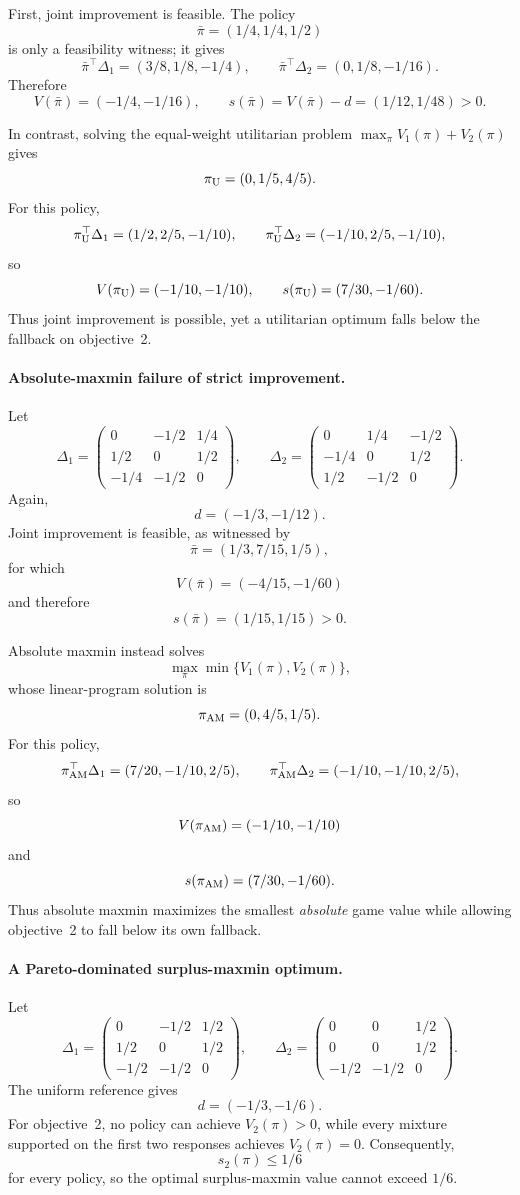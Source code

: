 \documentclass{article}
\theoremstyle{remark}
\theoremstyle{plain}
\begin{document}
First, joint improvement is feasible. The policy
\[
\bar\pi=(1/4,1/4,1/2)
\]
is only a feasibility witness; it gives
\[
\bar\pi^\top \Delta_1=(3/8,1/8,-1/4),
\qquad
\bar\pi^\top \Delta_2=(0,1/8,-1/16).
\]
Therefore
\[
V(\bar\pi)=(-1/4,-1/16),
\qquad
s(\bar\pi)
=
V(\bar\pi)-d
=
(1/12,1/48)>0.
\]

In contrast, solving the equal-weight utilitarian problem
$\max_\pi V_1(\pi)+V_2(\pi)$ gives
\[
\pi_{\rm U}=(0,1/5,4/5).
\]
For this policy,
\[
\pi_{\rm U}^\top \Delta_1=(1/2,2/5,-1/10),
\qquad
\pi_{\rm U}^\top \Delta_2=(-1/10,2/5,-1/10),
\]
so
\[
V(\pi_{\rm U})=(-1/10,-1/10),
\qquad
s(\pi_{\rm U})
=
(7/30,-1/60).
\]
Thus joint improvement is possible, yet a utilitarian optimum falls
below the fallback on objective~2.

\paragraph{Absolute-maxmin failure of strict improvement.}
Let
\[
\Delta_1=
\begin{pmatrix}
0&-1/2&1/4\\
1/2&0&1/2\\
-1/4&-1/2&0
\end{pmatrix},
\qquad
\Delta_2=
\begin{pmatrix}
0&1/4&-1/2\\
-1/4&0&1/2\\
1/2&-1/2&0
\end{pmatrix}.
\]
Again,
\[
d=(-1/3,-1/12).
\]
Joint improvement is feasible, as witnessed by
\[
\bar\pi=(1/3,7/15,1/5),
\]
for which
\[
V(\bar\pi)=(-4/15,-1/60)
\]
and therefore
\[
s(\bar\pi)=(1/15,1/15)>0.
\]

Absolute maxmin instead solves
\[
\max_{\pi}\min\{V_1(\pi),V_2(\pi)\},
\]
whose linear-program solution is
\[
\pi_{\rm AM}=(0,4/5,1/5).
\]
For this policy,
\[
\pi_{\rm AM}^\top \Delta_1=(7/20,-1/10,2/5),
\qquad
\pi_{\rm AM}^\top \Delta_2=(-1/10,-1/10,2/5),
\]
so
\[
V(\pi_{\rm AM})=(-1/10,-1/10)
\]
and
\[
s(\pi_{\rm AM})
=
(7/30,-1/60).
\]
Thus absolute maxmin maximizes the smallest \emph{absolute} game value
while allowing objective~2 to fall below its own fallback.

\paragraph{A Pareto-dominated surplus-maxmin optimum.}
Let
\[
\Delta_1=
\begin{pmatrix}
0&-1/2&1/2\\
1/2&0&1/2\\
-1/2&-1/2&0
\end{pmatrix},
\qquad
\Delta_2=
\begin{pmatrix}
0&0&1/2\\
0&0&1/2\\
-1/2&-1/2&0
\end{pmatrix}.
\]
The uniform reference gives
\[
d=(-1/3,-1/6).
\]
For objective~2, no policy can achieve $V_2(\pi)>0$, while every mixture
supported on the first two responses achieves $V_2(\pi)=0$.
Consequently,
\[
s_2(\pi)\le 1/6
\]
for every policy, so the optimal surplus-maxmin value cannot exceed
$1/6$.
\end{document}
